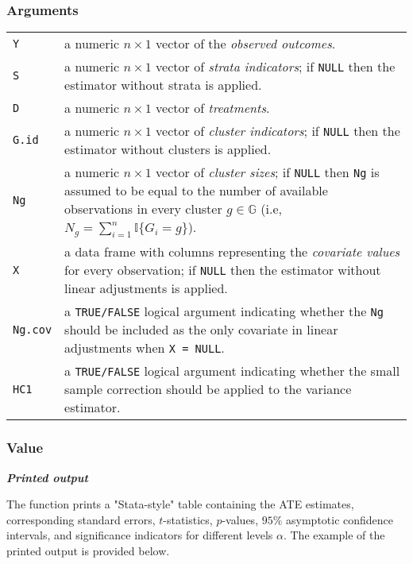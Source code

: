 \documentclass{article}
\makeatletter
\newenvironment{argdesc}{
    \par %
    \noindent %
    \normalfont %
    
    \begin{tabular}{@{}p{0.3\textwidth}p{0.6\textwidth}@{}} %
}{
    \end{tabular}
    \par %
   
}
\makeatother
\begin{document}
\subsubsection*{Arguments}
\begin{argdesc}
    \texttt{Y} & a numeric $n \times 1$ vector of the \textit{observed outcomes}. \\
    \texttt{S} & a numeric $n \times 1$ vector of \textit{strata indicators}; if \texttt{NULL} then the estimator without strata is applied. \\
    \texttt{D} & a numeric $n \times 1$ vector of \textit{treatments}. \\
    \texttt{G.id} & a numeric $n \times 1$ vector of \textit{cluster indicators}; if \texttt{NULL} then the estimator without clusters is applied. \\
    \texttt{Ng} & a numeric $n \times 1$ vector of \textit{cluster sizes}; if \texttt{NULL} then \texttt{Ng} is assumed to be equal to the number of available observations in every cluster $g \in \mathbb{G}$ (i.e, $N_g = \sum_{i = 1}^{n} \mathbb{I}\{G_{i} = g\}$). \\
    \texttt{X} & a data frame with columns representing the \textit{covariate values} for every observation; if \texttt{NULL} then the estimator without linear adjustments is applied. \\
    \texttt{Ng.cov} & a \texttt{TRUE/FALSE} logical argument indicating whether the \texttt{Ng} should be included as the only covariate in linear adjustments when \texttt{X = NULL}. \\
    \texttt{HC1} & a \texttt{TRUE/FALSE} logical argument indicating whether the small sample correction should be applied to the variance estimator. \\
\end{argdesc}

\subsubsection*{Value}
\noindent \textit{\textbf{Printed output}}

The function prints a "Stata-style" table containing the ATE estimates, corresponding standard errors, $t$-statistics, $p$-values, $95\%$ asymptotic confidence intervals, and significance indicators for different levels $\alpha$. The example of the printed output is provided below.
\end{document}
